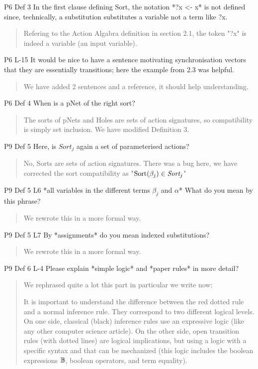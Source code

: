 \documentclass{article}
\begin{document}
P6 Def 3 In the first clause defining Sort, the notation *?x <- x* is not defined since, technically, a substitution substitutes a variable not a term like ?x.
\begin{quote}
Refering to the Action Algabra definition in section 2.1, the token "?x" is indeed a variable (an input variable).
\end{quote}

P6 L-15 It would be nice to have a sentence motivating synchronisation vectors that they are essentially transitions; here the example from 2.3 was helpful.
\begin{quote}
We have added 2 sentences and a reference, it should help understanding. 
\end{quote}

P6 Def 4 When is a pNet of the right sort?
\begin{quote}
The sorts of pNets and Holes are sets of action signatures, so compatibility is simply set inclusion. We have modified Definition 3.
\end{quote}

P9 Def 5 Here, is $Sort_j$ again a set of parameterised actions?
\begin{quote}
No, Sorts are sets of action signatures. There was a bug here, we have corrected the sort compatibility as "$\Sortop(\beta_j)\in\Sort_j$"
\end{quote}

P9 Def 5 L6 *all variables in the different terms $\beta_j$ and $\alpha$* What do you mean by this phrase?
\begin{quote}
We rewrote this in a more formal way.
\end{quote}

P9 Def 5 L7 By *assignments* do you mean indexed substitutions?
\begin{quote}
We rewrote this in a more formal way.
\end{quote}

P9 Def 6 L-4 Please explain *simple logic* and *paper rules* in more detail?

\begin{quote}
We rephrased quite a lot this part in particular we write now:

It is important to understand the difference between the red dotted rule and a normal 
inference rule. They correspond to two different logical levels.
On one side, classical (black) inference rules  use  an expressive logic (like any other computer science article).
 On the other side, open transition rules (with dotted lines) are logical implications, but using a  logic with a specific syntax and that can be mechanized (this logic includes the boolean expressions $\mathbb{B}$, boolean operators, and term equality).
\end{quote}
\end{document}
